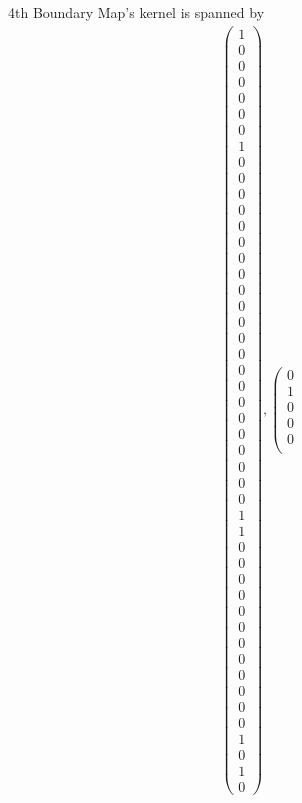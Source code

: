 \documentclass[8pt]{article}
\begin{document}
 4th Boundary Map's kernel is spanned by
 \begin{align*} \left(\begin{array}{r}
1 \\
0 \\
0 \\
0 \\
0 \\
0 \\
0 \\
1 \\
0 \\
0 \\
0 \\
0 \\
0 \\
0 \\
0 \\
0 \\
0 \\
0 \\
0 \\
0 \\
0 \\
0 \\
0 \\
0 \\
0 \\
0 \\
0 \\
0 \\
0 \\
0 \\
1 \\
1 \\
0 \\
0 \\
0 \\
0 \\
0 \\
0 \\
0 \\
0 \\
0 \\
0 \\
0 \\
0 \\
1 \\
0 \\
1 \\
0
\end{array}\right) ,
 \left(\begin{array}{r}
0 \\
1 \\
0 \\
0 \\
0 \\

\end{array}
\end{align*}
\end{document}

